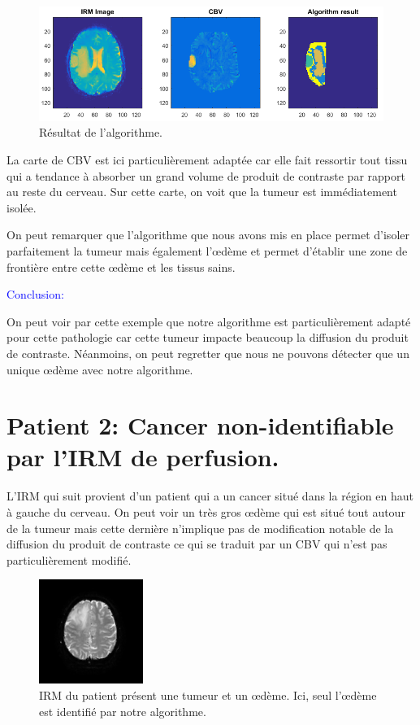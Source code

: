 \begin{figure}[H]
\centering
    \includegraphics[scale=0.8,angle=0]{Images/Patient4Result.png}
    \caption{Résultat de l'algorithme.}
    \label{fig:patient4IRMResult}
\end{figure}

La carte de CBV est ici particulièrement adaptée car elle fait ressortir tout tissu qui a tendance à absorber un grand volume de produit de contraste par rapport au reste du cerveau. Sur cette carte, on voit que la tumeur est immédiatement isolée.

On peut remarquer que l'algorithme que nous avons mis en place permet d'isoler parfaitement la tumeur mais également l'œdème et permet d'établir une zone de frontière entre cette œdème et les tissus sains.

\bigskip
\begin{Large}
\textcolor{blue}{Conclusion:}
\end{Large}
\medskip

On peut voir par cette exemple que notre algorithme est particulièrement adapté pour cette pathologie car cette tumeur impacte beaucoup la diffusion du produit de contraste. Néanmoins, on peut regretter que nous ne pouvons détecter que un unique œdème avec notre algorithme.


\section{Patient 2: Cancer non-identifiable par l'IRM de perfusion.}

L'IRM qui suit provient d'un patient qui a un cancer situé dans la région en haut à gauche du cerveau. On peut voir un très gros œdème qui est situé tout autour de la tumeur mais cette dernière n'implique pas de modification notable de la diffusion du produit de contraste ce qui se traduit par un CBV qui n'est pas particulièrement modifié.

\begin{figure}[H]
\centering
    \includegraphics[scale=2,angle=0]{Images/Patient2IRM.png}
    \caption{IRM du patient présent une tumeur et un œdème. Ici, seul l'œdème est identifié par notre algorithme.}
    \label{fig:patient4IRM}
\end{figure}

